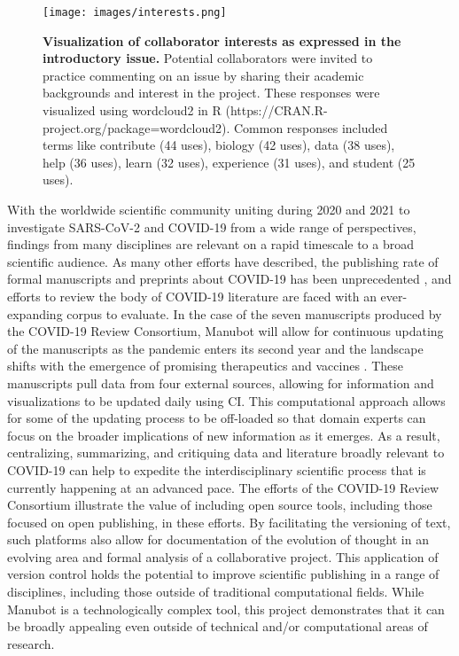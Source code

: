 \documentclass[sigconf]{acmart}
\begin{document}
\begin{figure}
\hypertarget{fig:wordcloud}{%
\centering
\texttt{[image: images/interests.png]}
\caption{\textbf{Visualization of collaborator interests as expressed in the introductory issue.}
Potential collaborators were invited to practice commenting on an issue by sharing their academic backgrounds and interest in the project.
These responses were visualized using wordcloud2 in R (https://CRAN.R-project.org/package=wordcloud2).
Common responses included terms like contribute (44 uses), biology (42 uses), data (38 uses), help (36 uses), learn (32 uses), experience (31 uses), and student (25 uses).}\label{fig:wordcloud}
}
\end{figure}

With the worldwide scientific community uniting during 2020 and 2021 to investigate SARS-CoV-2 and COVID-19 from a wide range of perspectives, findings from many disciplines are relevant on a rapid timescale to a broad scientific audience.
As many other efforts have described, the publishing rate of formal manuscripts and preprints about COVID-19 has been unprecedented \citep{7ub6VM4Z}, and efforts to review the body of COVID-19 literature are faced with an ever-expanding corpus to evaluate.
In the case of the seven manuscripts produced by the COVID-19 Review Consortium, Manubot will allow for continuous updating of the manuscripts as the pandemic enters its second year and the landscape shifts with the emergence of promising therapeutics and vaccines \citep{cifK9B8t, i2CGFwI3}.
These manuscripts pull data from four external sources, allowing for information and visualizations to be updated daily using CI.
This computational approach allows for some of the updating process to be off-loaded so that domain experts can focus on the broader implications of new information as it emerges.
As a result, centralizing, summarizing, and critiquing data and literature broadly relevant to COVID-19 can help to expedite the interdisciplinary scientific process that is currently happening at an advanced pace.
The efforts of the COVID-19 Review Consortium illustrate the value of including open source tools, including those focused on open publishing, in these efforts.
By facilitating the versioning of text, such platforms also allow for documentation of the evolution of thought in an evolving area and formal analysis of a collaborative project.
This application of version control holds the potential to improve scientific publishing in a range of disciplines, including those outside of traditional computational fields.
While Manubot is a technologically complex tool, this project demonstrates that it can be broadly appealing even outside of technical and/or computational areas of research.
\end{document}
